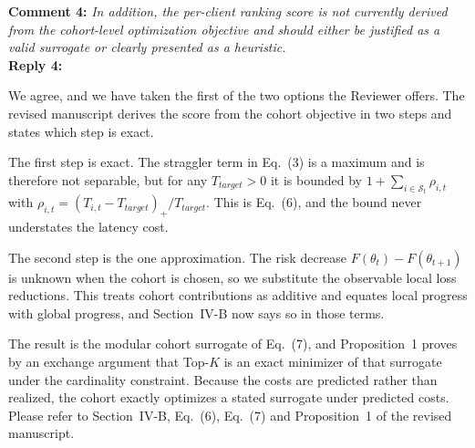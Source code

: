 \documentclass[10pt]{article}
\begin{document}
\noindent
\textbf{Comment 4:} \textit{In addition, the per-client ranking score is not currently derived from the cohort-level optimization objective and should either be justified as a valid surrogate or clearly presented as a heuristic.}\\
\noindent
\textbf{Reply 4:} {We agree, and we have taken the first of the two options the Reviewer offers. The revised manuscript derives the score from the cohort objective in two steps and states which step is exact.

The first step is exact. The straggler term in Eq.~(3) is a maximum and is therefore not separable, but for any $T_{target}>0$ it is bounded by $1+\sum_{i\in\mathcal{S}_t}\rho_{i,t}$ with $\rho_{i,t}=(T_{i,t}-T_{target})_+/T_{target}$. This is Eq.~(6), and the bound never understates the latency cost.

The second step is the one approximation. The risk decrease $F(\theta_t)-F(\theta_{t+1})$ is unknown when the cohort is chosen, so we substitute the observable local loss reductions. This treats cohort contributions as additive and equates local progress with global progress, and Section~IV-B now says so in those terms.

The result is the modular cohort surrogate of Eq.~(7), and Proposition~1 proves by an exchange argument that Top-$K$ is an exact minimizer of that surrogate under the cardinality constraint. Because the costs are predicted rather than realized, the cohort exactly optimizes a stated surrogate under predicted costs. Please refer to Section~IV-B, Eq.~(6), Eq.~(7) and Proposition~1 of the revised manuscript.}\\
\end{document}

